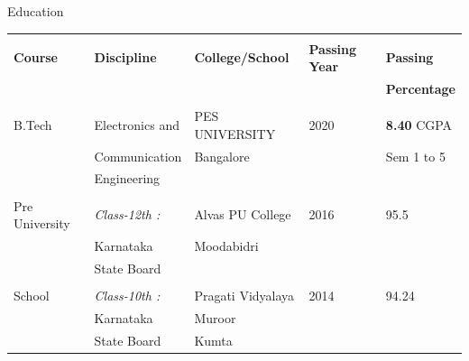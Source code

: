 \documentclass{resume} %
\begin{document}
\begin{rSection}{Education}

\begin{tabular}{ |p{3cm}|p{3cm}|p{3.5cm}|p{2cm}|p{2.5cm}| }

 \hline
 &&&&\\ \textbf{ Course} & \textbf{Discipline} & \textbf{College/School}& \textbf{Passing Year} &  \textbf{Passing}\\
&&&&\textbf{Percentage}\\

 \hline
&&&&\\B.Tech &  Electronics and  &        PES UNIVERSITY &       2020 &         \textbf{8.40} CGPA\\
&Communication&Bangalore&&Sem 1 to 5\\
&Engineering&&&\\

 \hline
&&&&\\Pre University &\textit{Class-12th :} &Alvas PU College& 2016 & 95.5\\
&Karnataka & Moodabidri &&\\
&State Board& &&\\

\hline
&&&&\\School&\textit{Class-10th :}& Pragati Vidyalaya &2014& 94.24\\
&Karnataka& Muroor &&\\
&State Board&Kumta&&\\

\hline
\end{tabular}


\end{rSection}

\vspace{1cm}

\newpage

\end{document}
